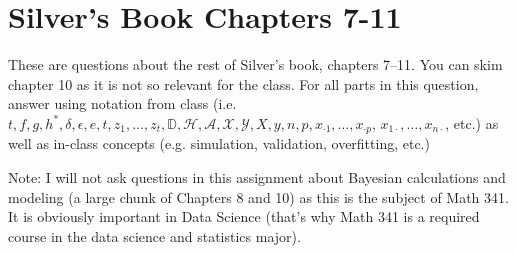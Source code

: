 \documentclass[12pt]{article}
\begin{document}
\section{Silver's Book Chapters 7-11}
These are questions about the rest of Silver's book, chapters 7--11. You can skim chapter 10 as it is not so relevant for the class. For all parts in this question, answer using notation from class (i.e. $t ,f, g, h^*, \delta, \epsilon, e, t, z_1, \ldots, z_t, \mathbb{D}, \mathcal{H}, \mathcal{A}, \mathcal{X}, \mathcal{Y}, X, y, n, p, x_{\cdot 1}, \ldots, x_{\cdot p}$, $x_{1 \cdot}, \ldots, x_{n \cdot}$, etc.) as well as in-class concepts (e.g. simulation, validation, overfitting, etc.)

Note: I will not ask questions in this assignment about Bayesian calculations and modeling (a large chunk of Chapters 8 and 10) as this is the subject of Math 341. It is obviously important in Data Science (that's why Math 341 is a required course in the data science and statistics major). %
\end{document}
